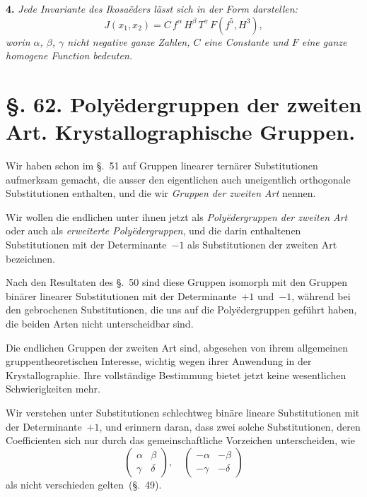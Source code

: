 \documentclass[12pt,a4paper]{article}
\theoremstyle{plain}
\theoremstyle{definition}
\theoremstyle{remark}
\begin{document}
\medskip\noindent\textbf{4.} \emph{Jede Invariante des Ikosa\"eders l\"asst sich in der Form darstellen:}
\begin{equation}\tag{2}
J(x_{1}, x_{2}) = C\,f^{\alpha}\,H^{\beta}\,T^{\gamma}\,F(f^{5}, H^{3}),
\end{equation}
\emph{worin $\alpha$, $\beta$, $\gamma$ nicht negative ganze Zahlen, $C$ eine Constante und $F$ eine ganze homogene Function bedeuten.}


\section*{\S. 62. Poly\"edergruppen der zweiten Art. Krystallographische Gruppen.}

Wir haben schon im \S.~51 auf Gruppen linearer tern\"arer Substitutionen aufmerksam gemacht, die ausser den eigentlichen auch uneigentlich orthogonale Substitutionen enthalten, und die wir \emph{Gruppen der zweiten Art} nennen.

Wir wollen die endlichen unter ihnen jetzt als \emph{Poly\"edergruppen der zweiten Art} oder auch als \emph{erweiterte Poly\"edergruppen}, und die darin enthaltenen Substitutionen mit der Determinante~$-1$ als Substitutionen der zweiten Art bezeichnen.

Nach den Resultaten des \S.~50 sind diese Gruppen isomorph mit den Gruppen bin\"arer linearer Substitutionen mit der Determinante~$+1$ und~$-1$, w\"ahrend bei den gebrochenen Substitutionen, die uns auf die Poly\"edergruppen gef\"uhrt haben, die beiden Arten nicht unterscheidbar sind.

Die endlichen Gruppen der zweiten Art sind, abgesehen von ihrem allgemeinen gruppentheoretischen Interesse, wichtig wegen ihrer Anwendung in der Krystallographie. Ihre vollst\"andige Bestimmung bietet jetzt keine wesentlichen Schwierigkeiten mehr.

Wir verstehen unter Substitutionen schlechtweg bin\"are lineare Substitutionen mit der Determinante~$+1$, und erinnern daran, dass zwei solche Substitutionen, deren Coefficienten sich nur durch das gemeinschaftliche Vorzeichen unterscheiden, wie
\[
\begin{pmatrix} \alpha & \beta \\ \gamma & \delta \end{pmatrix},\quad
\begin{pmatrix} -\alpha & -\beta \\ -\gamma & -\delta \end{pmatrix}
\]
als nicht verschieden gelten~(\S.~49).
\end{document}
